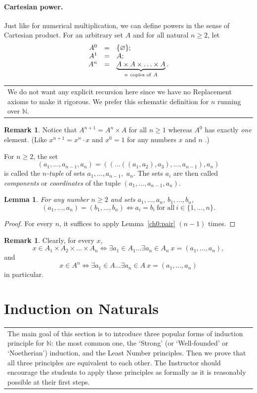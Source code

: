 \documentclass[12pt,notitlepage]{article}
\theoremstyle{plain}
\newtheorem{lemma}[thm]{Lemma}
\theoremstyle{definition}
\newtheorem{rem}[thm]{Remark}
\theoremstyle{plain}
\newcommand{\N}{\mathbb{N}}
\newcommand{\void}{\varnothing}
\newcommand{\1}{\mathbf{1}}
\newcommand{\0}{\mathbf{0}}
\newcommand{\mcomm}[1]{
\medskip\noindent\begin{tabular}{| l}
\parbox{0.99\textwidth}{{\small
#1 }}\end{tabular}
\smallskip}
\begin{document}
\paragraph{Cartesian power.} Just like for numerical multiplication, we can define powers in the sense of Cartesian product. For an arbitrary set $A$ and for all natural $n \geq 2$, let
$$
\begin{array}{rcl}
A^0 &=& \{\void\};\\
A^1 &=& A;\\
A^n &=& \underbrace{A \times A \times \ldots \times A}_{n\ \mbox{\scriptsize copies of}\ A}.
\end{array}
$$
\mcomm{We do not want any explicit recursion here since we have no Replacement axioms to make it rigorous. We prefer this schematic definition for $n$ running over $\N$.}
\begin{rem}\label{ch0:cart_pow}
Notice that $A^{n+1} = A^n \times A$ for all $n \geq 1$ whereas $A^0$ has exactly \emph{one} element. (Like $x^{n+1} = x^n \cdot x$ and $x^0 = 1$ for any numbers $x$ and $n$ .)
\end{rem}

For $n \geq 2$, the set
$$(a_1,\ldots, a_{n-1}, a_{n}) = ((\ldots ((a_1,a_2), a_3), \ldots, a_{n-1}), a_{n})$$
is called the \emph{$n$-tuple} of sets $a_1, \ldots, a_{n-1},$ $a_{n}$. The sets $a_i$ are then called \emph{components} or \emph{coordinates} of the tuple $(a_1,\ldots, a_{n-1}, a_{n})$.
\begin{lemma}\label{L2:l_tuple_id}
For any number $n \geq 2$ and sets $a_1, \ldots, a_{n}$, $b_1, \ldots, b_{n}$,
$$(a_1,\ldots, a_{n}) = (b_1,\ldots, b_{n}) \iff a_i = b_i\ \mbox{for all}\ i \in \{1,\ldots,n\}.$$
\end{lemma}
\begin{proof}
For every $n$, it suffices to apply Lemma~\ref{ch0:pair} $(n-1)$ times.
\end{proof}

\begin{rem}
Clearly, for every $x$,
$$x \in A_1 \times A_2 \times \ldots \times A_n \iff \exists a_1 \in A_1 \ldots \exists a_n \in A_n\ x = (a_1,\ldots,a_n),$$
and
$$x \in A^n \iff \exists a_1 \in A \ldots \exists a_n \in A\ x = (a_1,\ldots,a_n)$$
in particular.
\end{rem}

\section{Induction on Naturals}
\mcomm{The main goal of this section is to introduce three popular forms of induction principle for $\N$: the most common one, the `Strong' (or `Well-founded' or `Noetherian') induction, and the Least Number principles. Then we prove that all three principles are equivalent to each other. The Instructor should encourage the students to apply these principles as formally as it is reasonably possible at their first steps.}
\end{document}
